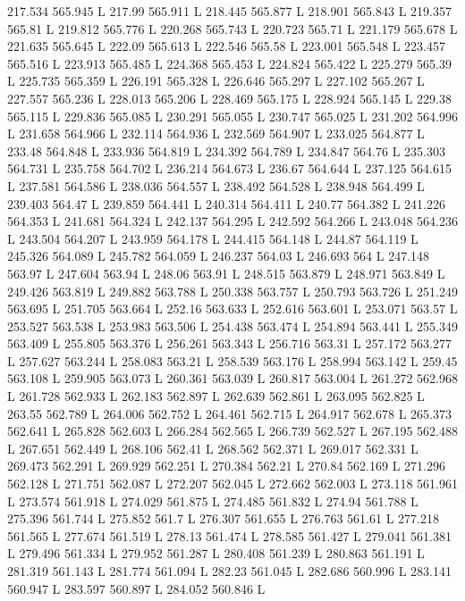 217.534 565.945 L
217.99 565.911 L
218.445 565.877 L
218.901 565.843 L
219.357 565.81 L
219.812 565.776 L
220.268 565.743 L
220.723 565.71 L
221.179 565.678 L
221.635 565.645 L
222.09 565.613 L
222.546 565.58 L
223.001 565.548 L
223.457 565.516 L
223.913 565.485 L
224.368 565.453 L
224.824 565.422 L
225.279 565.39 L
225.735 565.359 L
226.191 565.328 L
226.646 565.297 L
227.102 565.267 L
227.557 565.236 L
228.013 565.206 L
228.469 565.175 L
228.924 565.145 L
229.38 565.115 L
229.836 565.085 L
230.291 565.055 L
230.747 565.025 L
231.202 564.996 L
231.658 564.966 L
232.114 564.936 L
232.569 564.907 L
233.025 564.877 L
233.48 564.848 L
233.936 564.819 L
234.392 564.789 L
234.847 564.76 L
235.303 564.731 L
235.758 564.702 L
236.214 564.673 L
236.67 564.644 L
237.125 564.615 L
237.581 564.586 L
238.036 564.557 L
238.492 564.528 L
238.948 564.499 L
239.403 564.47 L
239.859 564.441 L
240.314 564.411 L
240.77 564.382 L
241.226 564.353 L
241.681 564.324 L
242.137 564.295 L
242.592 564.266 L
243.048 564.236 L
243.504 564.207 L
243.959 564.178 L
244.415 564.148 L
244.87 564.119 L
245.326 564.089 L
245.782 564.059 L
246.237 564.03 L
246.693 564 L
247.148 563.97 L
247.604 563.94 L
248.06 563.91 L
248.515 563.879 L
248.971 563.849 L
249.426 563.819 L
249.882 563.788 L
250.338 563.757 L
250.793 563.726 L
251.249 563.695 L
251.705 563.664 L
252.16 563.633 L
252.616 563.601 L
253.071 563.57 L
253.527 563.538 L
253.983 563.506 L
254.438 563.474 L
254.894 563.441 L
255.349 563.409 L
255.805 563.376 L
256.261 563.343 L
256.716 563.31 L
257.172 563.277 L
257.627 563.244 L
258.083 563.21 L
258.539 563.176 L
258.994 563.142 L
259.45 563.108 L
259.905 563.073 L
260.361 563.039 L
260.817 563.004 L
261.272 562.968 L
261.728 562.933 L
262.183 562.897 L
262.639 562.861 L
263.095 562.825 L
263.55 562.789 L
264.006 562.752 L
264.461 562.715 L
264.917 562.678 L
265.373 562.641 L
265.828 562.603 L
266.284 562.565 L
266.739 562.527 L
267.195 562.488 L
267.651 562.449 L
268.106 562.41 L
268.562 562.371 L
269.017 562.331 L
269.473 562.291 L
269.929 562.251 L
270.384 562.21 L
270.84 562.169 L
271.296 562.128 L
271.751 562.087 L
272.207 562.045 L
272.662 562.003 L
273.118 561.961 L
273.574 561.918 L
274.029 561.875 L
274.485 561.832 L
274.94 561.788 L
275.396 561.744 L
275.852 561.7 L
276.307 561.655 L
276.763 561.61 L
277.218 561.565 L
277.674 561.519 L
278.13 561.474 L
278.585 561.427 L
279.041 561.381 L
279.496 561.334 L
279.952 561.287 L
280.408 561.239 L
280.863 561.191 L
281.319 561.143 L
281.774 561.094 L
282.23 561.045 L
282.686 560.996 L
283.141 560.947 L
283.597 560.897 L
284.052 560.846 L
